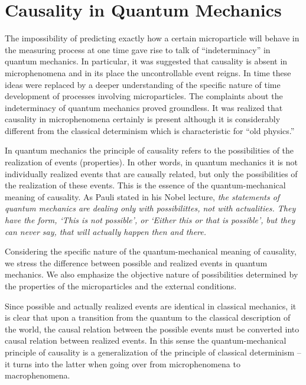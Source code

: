 \documentclass[a4paper,sfsidenotes,colorlinks=true]{tufte-book}
\numberwithin{equation}{section}
\numberwithin{figure}{section}
\begin{document}
\section{Causality in Quantum Mechanics}
\label{sec-12}

The impossibility of predicting exactly how a certain microparticle will behave in the measuring process at one time gave rise to talk of ``indeterminacy'' in quantum mechanics. In particular, it was suggested that causality is absent in microphenomena and in its place the uncontrollable event reigns. In time these ideas were replaced by a deeper understanding of the specific nature of time development of processes involving microparticles. The complaints about the indeterminacy of quantum mechanics proved groundless. It was realized that causality in microphenomena certainly is present although it is considerably different from the classical determinism which is characteristic for ``old physics.''


In quantum mechanics the principle of causality refers to
the possibilities of the realization of events (properties). In
other words, in quantum mechanics it is not individually realized
events that are causally related, but only the possibilities of the
realization of these events. This is the essence of the
quantum-mechanical meaning of causality. As Pauli stated in his Nobel
lecture, \emph{the statements of quantum mechanics are dealing only with
possibilittes, not with actualities. They have the form, `This is not
possible', or `Either this or that is possible', but they can never
say, that will actually happen then and there.}


Considering the specific nature of the quantum-mechanical meaning of causality, we stress the difference between possible and realized events in quantum mechanics. We also emphasize the objective nature of possibilities determined by the properties of the microparticles and the external conditions.


Since possible and actually realized events are identical in classical
mechanics, it is clear that upon a transition from the quantum to the
classical description of the world, the causal relation between the
possible events must be converted into causal relation between
realized events. In this sense the quantum-mechanical principle of
causality is a generalization of the principle of classical
determinism -- it turns into the latter when going over from
microphenomena to macrophenomena.
\end{document}
